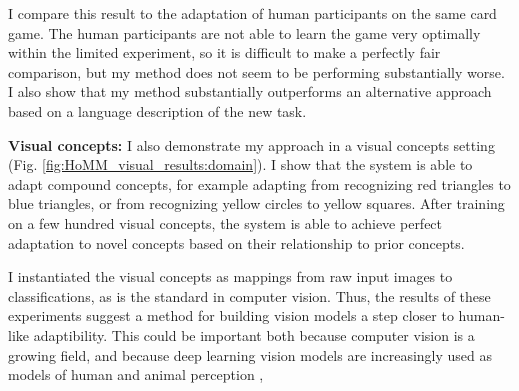 \documentclass[12pt]{article}
\begin{document}
I compare this result to the adaptation of human participants on the same card game. The human participants are not able to learn the game very optimally within the limited experiment, so it is difficult to make a perfectly fair comparison, but my method does not seem to be performing substantially worse. I also show that my method substantially outperforms an alternative approach based on a language description of the new task.

\textbf{Visual concepts:} I also demonstrate my approach in a visual concepts setting (Fig. \ref{fig:HoMM_visual_results:domain}). I show that the system is able to adapt compound concepts, for example adapting from recognizing red triangles to blue triangles, or from recognizing yellow circles to yellow squares. After training on a few hundred visual concepts, the system is able to achieve perfect adaptation to novel concepts based on their relationship to prior concepts.

I instantiated the visual concepts as mappings from raw input images to classifications, as is the standard in computer vision. Thus, the results of these experiments suggest a method for building vision models a step closer to human-like adaptibility. This could be important both because computer vision is a growing field, and because deep learning vision models are increasingly used as models of human and animal perception \citep{Yamins2014,Kriegeskorte2015},   
\end{document}
